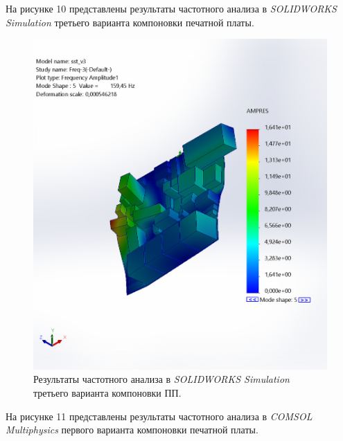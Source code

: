 На рисунке 10 представлены результаты частотного анализа в
\textit{SOLIDWORKS Simulation} третьего варианта компоновки печатной платы.


\begin{figure}[H]
  \centering
\includegraphics[scale=0.3]{../img/sst-3/freq/sst_v3-Freq-3-Amplitude-Amplitude1.jpg}
\caption{Результаты частотного анализа в \textit{SOLIDWORKS Simulation} третьего варианта компоновки ПП.}
\end{figure}

На рисунке 11 представлены результаты частотного анализа в
\textit{COMSOL Multiphysics} первого варианта компоновки печатной платы.

